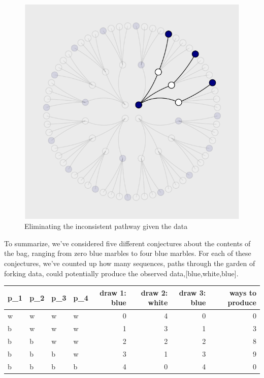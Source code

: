 \documentclass{article}
\begin{document}
\begin{figure}

{\centering \includegraphics{qrap_paper_files/figure-latex/unnamed-chunk-1-1} 

}

\caption{Eliminating the inconsistent pathway given the data}\label{fig:unnamed-chunk-1}
\end{figure}

To summarize, we've considered five different conjectures about the
contents of the bag, ranging from zero blue marbles to four blue
marbles. For each of these conjectures, we've counted up how many
sequences, paths through the garden of forking data, could potentially
produce the observed data,{[}blue,white,blue{]}.

\begin{table}[H]
\centering
\begin{tabular}{l|l|l|l|r|r|r|r}
\hline
p\_1 & p\_2 & p\_3 & p\_4 & draw 1: blue & draw 2: white & draw 3: blue & ways to produce\\
\hline
w & w & w & w & 0 & 4 & 0 & 0\\
\hline
b & w & w & w & 1 & 3 & 1 & 3\\
\hline
b & b & w & w & 2 & 2 & 2 & 8\\
\hline
b & b & b & w & 3 & 1 & 3 & 9\\
\hline
b & b & b & b & 4 & 0 & 4 & 0\\
\hline
\end{tabular}
\end{table}
\end{document}
